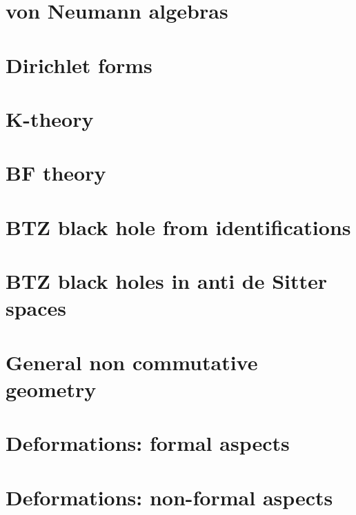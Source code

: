 \documentclass[french,a4paper]{book}
\begin{document}
\chapter{von Neumann algebras}





\chapter{Dirichlet forms}


\chapter{K-theory}


\chapter{BF theory}


\chapter{BTZ black hole from identifications}




\chapter{BTZ black holes in anti de Sitter spaces}                  \label{ChapBHinAdS}









\chapter{General non commutative geometry}




\chapter{Deformations: formal aspects}          \label{ChapDefo}


\chapter{Deformations: non-formal aspects}



\end{document}
